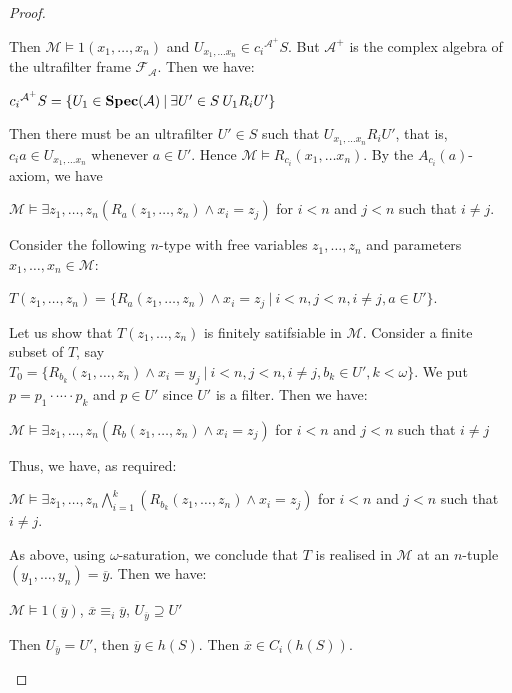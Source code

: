 \documentclass{article}
\theoremstyle{defin}
\theoremstyle{theorem}
\theoremstyle{claim}
\theoremstyle{prop}
\theoremstyle{lemma}
\theoremstyle{fact}
\theoremstyle{remark}
\theoremstyle{ex}
\theoremstyle{col}
\theoremstyle{question}
\begin{document}
\begin{proof}
\begin{enumerate}
Then $\mathcal{M} \models 1(x_1, \dots, x_n)$ and $U_{x_1, \dots x_n} \in c_i{^{\mathcal{A}^{+}}} S$. But $\mathcal{A}^{+}$ is the complex algebra of the ultrafilter frame $\mathcal{F}_{\mathcal{A}}$.
Then we have:
\begin{center}
$c_i{^{\mathcal{A}^{+}}} S = \{ U_1 \in {\bf Spec}(\mathcal{A}) \: | \: \exists U' \in S  \: U_1 R_{i} U' \}$
\end{center}
Then there must be an ultrafilter $U' \in S$ such that $U_{x_1, \dots x_n} R_{i} U'$, that is, $c_i a \in U_{x_1, \dots x_n}$ whenever $a \in U'$.
Hence $\mathcal{M} \models R_{c_i}(x_1, \dots x_n)$. By the $A_{c_i}(a)$-axiom, we have
\begin{center}
$\mathcal{M} \models \exists z_1, \dots, z_n (R_a(z_1, \dots, z_n) \land x_i = z_j)$ for $i < n$ and $j < n$ such that $i \neq j$.
\end{center}
Consider the following $n$-type with free variables $z_1, \dots, z_n$ and parameters $x_1, \dots, x_n \in \mathcal{M}$:
\begin{center}
$T(z_1, \dots, z_n) = \{ R_a(z_1, \dots, z_n) \land x_i = z_j \: | \: i < n, j < n, i \neq j, a \in U' \}$.
\end{center}
Let us show that $T(z_1, \dots, z_n)$ is finitely satifsiable in $\mathcal{M}$.
Consider a finite subset of $T$, say $T_0 = \{ R_{b_k}(z_1, \dots, z_n) \land x_i = y_j \: | \: i < n, j < n, i \neq j, b_k \in U', k < \omega \}$.
We put $p = p_1 \cdot \cdots \cdot p_k$ and $p \in U'$ since $U'$ is a filter. Then we have:
\begin{center}
$\mathcal{M} \models \exists z_1, \dots, z_n (R_b(z_1, \dots, z_n) \land x_i = z_j)$ for $i < n$ and $j < n$ such that $i \neq j$
\end{center}
Thus, we have, as required:
\begin{center}
$\mathcal{M} \models \exists z_1, \dots, z_n \bigwedge \limits_{i = 1}^{k} (R_{b_k}(z_1, \dots, z_n) \land x_i = z_j)$ for $i < n$ and $j < n$ such that $i \neq j$.
\end{center}
As above, using $\omega$-saturation, we conclude that $T$ is realised in $\mathcal{M}$ at an $n$-tuple $(y_1, \dots, y_n) = \overline{y}$.
Then we have:
\begin{center}
$\mathcal{M} \models 1(\overline{y})$, $\overline{x} \equiv_i \overline{y}$, $U_{\overline{y}} \supseteq U'$
\end{center}
Then $U_{\overline{y}} = U'$, then $\overline{y} \in h(S)$. Then $\overline{x} \in C_i (h (S))$.


\end{enumerate}
\end{proof}
\end{document}
